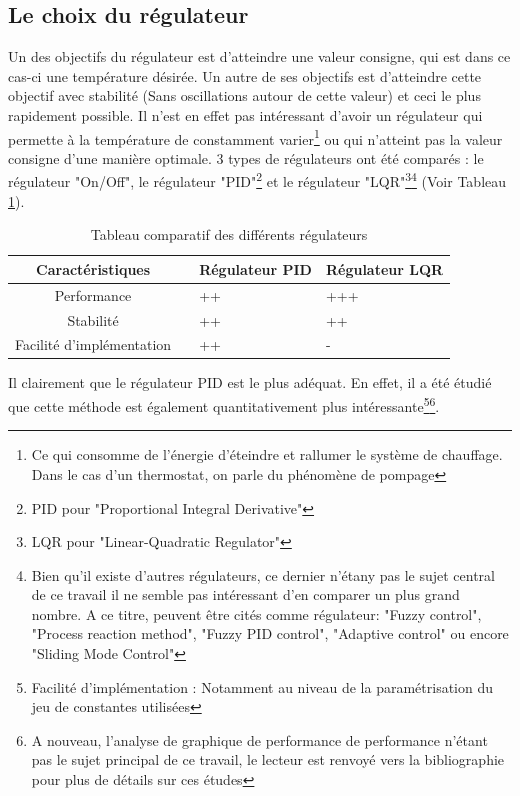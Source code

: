 \documentclass[11pt,a4paper,11pt]{report}
\begin{document}
\subsection{Le choix du régulateur}

Un des objectifs du régulateur est d'atteindre une valeur consigne, qui est dans ce cas-ci une température désirée. Un autre de ses objectifs est d'atteindre cette objectif avec stabilité (Sans oscillations autour de cette valeur) et ceci le plus rapidement possible. Il n'est en effet pas intéressant d'avoir un régulateur qui permette à la température de constamment varier\footnote{Ce qui consomme de l'énergie d'éteindre et rallumer le système de chauffage. Dans le cas d'un thermostat, on parle du phénomène de pompage} ou qui n'atteint pas la valeur consigne d'une manière optimale. 3 types de régulateurs ont été comparés : le régulateur "On/Off", le régulateur "PID"\footnote{PID pour "Proportional Integral Derivative"} et le régulateur "LQR"\footnote{LQR pour "Linear-Quadratic Regulator"}\footnote{Bien qu'il existe d'autres régulateurs, ce dernier n'étany pas le sujet central de ce travail il ne semble pas intéressant d'en comparer un plus grand nombre. A ce titre, peuvent être cités comme régulateur: "Fuzzy control", "Process reaction method", "Fuzzy PID control", "Adaptive control" ou encore "Sliding Mode Control"} (Voir Tableau \ref{regulateur}).

\begin{table}[h]
   \centering
   \begin{tabularx}{\linewidth}{|c|X|X|X|}
      \hline
       Caractéristiques & \centering{ Régulateur On/Off} & \centering Régulateur PID & \centering Régulateur LQR \tabularnewline
      \hline
      Performance &\centering{ - } & \centering ++ &\centering +++\tabularnewline
      \hline
      Stabilité &\centering{ - } & \centering ++ &\centering ++\tabularnewline
      \hline
      Facilité d'implémentation &\centering{ +++ } & \centering ++ &\centering -\tabularnewline
      \hline

	\end{tabularx}
\caption{\label{regulateur} Tableau comparatif des différents régulateurs}
\end{table}

Il clairement que le régulateur PID est le plus adéquat. En effet, il a été étudié que cette méthode est également quantitativement plus intéressante\footnote{Facilité d'implémentation : Notamment au niveau de la paramétrisation du jeu de constantes utilisées}\footnote{A nouveau, l'analyse de graphique de performance de performance n'étant pas le sujet principal de ce travail, le lecteur est renvoyé vers la bibliographie pour plus de détails sur ces études}.
\end{document}
